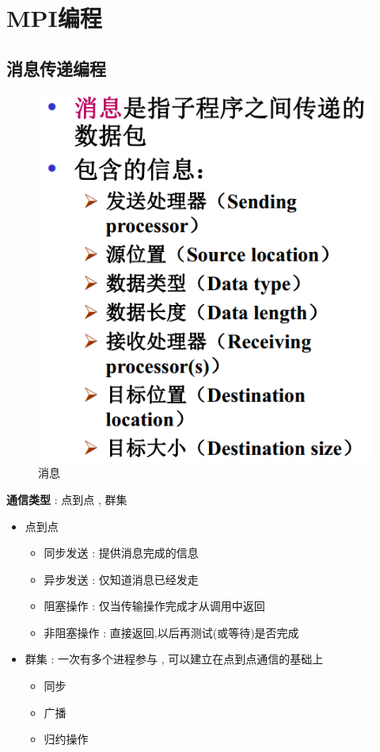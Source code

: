 \documentclass[UTF8,a4paper]{ctexart}
\begin{document}
\section{MPI编程}
\subsection{消息传递编程}

\begin{figure}[H]
  \centering
  \includegraphics[scale = 0.3]{assets/ParallelComputing_449cf.png}
  \caption{消息}
\end{figure}

\textbf{通信类型} : 点到点 , 群集
\begin{itemize}
  \item 点到点
  \begin{itemize}
    \item 同步发送 : 提供消息完成的信息
    \item 异步发送 : 仅知道消息已经发走
    \item 阻塞操作 : 仅当传输操作完成才从调用中返回
    \item 非阻塞操作 : 直接返回,以后再测试(或等待)是否完成
  \end{itemize}
  \item 群集 : 一次有多个进程参与 , 可以建立在点到点通信的基础上
  \begin{itemize}
    \item 同步
    \item 广播
    \item 归约操作
  \end{itemize}
\end{itemize}
\end{document}

